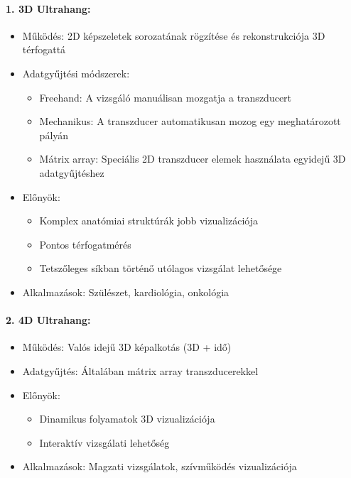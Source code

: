 \documentclass[a4paper,12pt]{article}
\begin{document}
\paragraph{1. 3D Ultrahang:} \begin{itemize} \item Működés: 2D képszeletek sorozatának rögzítése és rekonstrukciója 3D térfogattá \item Adatgyűjtési módszerek: \begin{itemize} \item Freehand: A vizsgáló manuálisan mozgatja a transzducert \item Mechanikus: A transzducer automatikusan mozog egy meghatározott pályán \item Mátrix array: Speciális 2D transzducer elemek használata egyidejű 3D adatgyűjtéshez \end{itemize} \item Előnyök: \begin{itemize} \item Komplex anatómiai struktúrák jobb vizualizációja \item Pontos térfogatmérés \item Tetszőleges síkban történő utólagos vizsgálat lehetősége \end{itemize} \item Alkalmazások: Szülészet, kardiológia, onkológia \end{itemize}

\paragraph{2. 4D Ultrahang:} \begin{itemize} \item Működés: Valós idejű 3D képalkotás (3D + idő) \item Adatgyűjtés: Általában mátrix array transzducerekkel \item Előnyök: \begin{itemize} \item Dinamikus folyamatok 3D vizualizációja \item Interaktív vizsgálati lehetőség \end{itemize} \item Alkalmazások: Magzati vizsgálatok, szívműködés vizualizációja \end{itemize}
\end{document}
